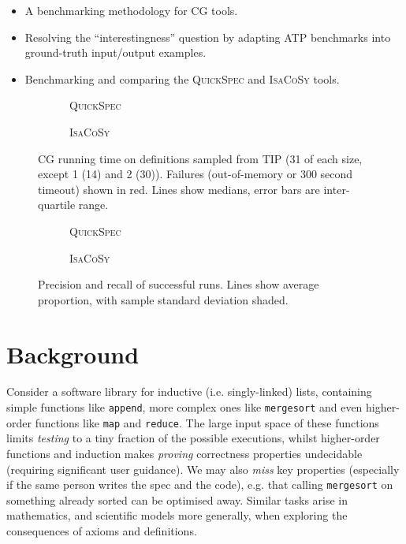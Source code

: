 \documentclass[]{default}
\begin{document}
\begin{itemize}
\item A benchmarking methodology for CG tools.
\item Resolving the ``interestingness'' question by adapting ATP benchmarks into
  ground-truth input/output examples.
\item Benchmarking and comparing the \textsc{QuickSpec} and \textsc{IsaCoSy}
  tools.
\end{itemize}

\begin{figure}
  \begin{subfigure}{.5\textwidth}
    \centering
    
    \caption{\textsc{QuickSpec}}
  \end{subfigure}
  \begin{subfigure}{.5\textwidth}
    \centering
    
    \caption{\textsc{IsaCoSy}}
  \end{subfigure}

  \caption{CG running time on definitions sampled from TIP (31 of each size,
    except 1 (14) and 2 (30)). Failures (out-of-memory or 300 second timeout)
    shown in red. Lines show medians, error bars are inter-quartile range.}
  \label{figure:quickspec_runtimes}
\end{figure}

\begin{figure*}
  \begin{subfigure}{.5\textwidth}
    \centering
    
    \caption{\textsc{QuickSpec}}
  \end{subfigure}%
  \begin{subfigure}{.5\textwidth}
    \centering
    
    \caption{\textsc{IsaCoSy}}
  \end{subfigure}

  \caption{Precision and recall of successful runs. Lines show average
    proportion, with sample standard deviation shaded.}
  \label{figure:quickspec_precRec}
\end{figure*}

\section{Background}

Consider a software library for inductive (i.e. singly-linked) lists, containing
simple functions like \texttt{append}, more complex ones like \texttt{mergesort}
and even higher-order functions like \texttt{map} and \texttt{reduce}. The large
input space of these functions limits \emph{testing} to a tiny fraction of the
possible executions, whilst higher-order functions and induction makes
\emph{proving} correctness properties undecidable (requiring significant user
guidance). We may also \emph{miss} key properties (especially if the same person
writes the spec and the code), e.g. that calling \texttt{mergesort} on something
already sorted can be optimised away. Similar tasks arise in mathematics, and
scientific models more generally, when exploring the consequences of axioms and
definitions.
\end{document}
